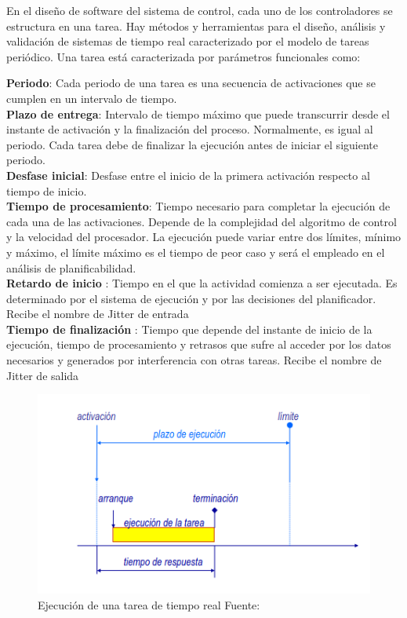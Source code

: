 \documentclass[12pt]{article}
\begin{document}

En el diseño de software del sistema de control, cada uno de los controladores se estructura en una tarea. Hay métodos y herramientas para el diseño, análisis y validación de sistemas de tiempo real caracterizado por el modelo de tareas periódico. Una tarea está caracterizada por parámetros funcionales como: 


\textbf{Periodo}: Cada periodo de una tarea es una secuencia de activaciones que se cumplen en un intervalo de tiempo.\\
\textbf{Plazo de entrega}:  Intervalo de tiempo máximo que puede transcurrir desde el instante de activación y la finalización del proceso. Normalmente, es igual al periodo. Cada tarea debe de finalizar la ejecución antes de iniciar el siguiente periodo. \\
\textbf{Desfase inicial}: Desfase entre el inicio de la primera activación respecto al tiempo de inicio.\\
\textbf{Tiempo de procesamiento}: Tiempo necesario para completar la ejecución de cada una de las activaciones. Depende de la complejidad del algoritmo de control y la velocidad del procesador. La ejecución puede variar entre dos límites, mínimo y máximo, el límite máximo es el tiempo de peor caso y será el empleado en el análisis de planificabilidad.\\
\textbf{Retardo de inicio} : Tiempo en el que la actividad comienza a ser ejecutada. Es determinado por el sistema de ejecución y por las decisiones del planificador. Recibe el nombre de Jitter de entrada\\
\textbf{Tiempo de finalización} : Tiempo que depende del instante de inicio de la ejecución, tiempo de procesamiento y retrasos que sufre al acceder por los datos necesarios y generados por interferencia con otras tareas. Recibe el nombre de Jitter de salida\\


\begin{figure}[!ht]
  \centering
  \includegraphics[scale=0.5]{diagramas/tiempo_real.png}
  \caption{Ejecución de una tarea de tiempo real Fuente: \cite{de2000introduccion}}
  \label{fig:diagrama_tiempo_real}
\end{figure}
\end{document}
